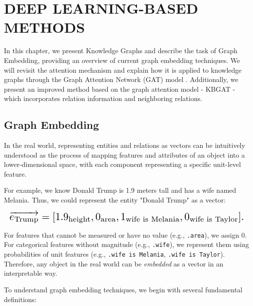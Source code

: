 \section{DEEP LEARNING-BASED METHODS}
\label{chap:DeeLearning}

In this chapter, we present Knowledge Graphs and describe the task of Graph Embedding, providing an overview of current graph embedding techniques. We will revisit the attention mechanism and explain how it is applied to knowledge graphs through the Graph Attention Network (GAT) model \cite{velivckovic2017graph}. Additionally, we present an improved method based on the graph attention model - KBGAT \cite{nathani2019learning} - which incorporates relation information and neighboring relations.

\subsection{Graph Embedding}
\label{sec:graphEmbedding}

In the real world, representing entities and relations as vectors can be intuitively understood as the process of mapping features and attributes of an object into a lower-dimensional space, with each component representing a specific unit-level feature.

For example, we know Donald Trump is 1.9 meters tall and has a wife named Melania. Thus, we could represent the entity "Donald Trump" as a vector:

\[
\resizebox{\linewidth}{!}{$
\overrightarrow{e_\text{Trump}} = [1.9_{\text{height}}, 0_{\text{area}}, 1_{\text{wife is Melania}}, 0_{\text{wife is Taylor}}].
$}
\]

For features that cannot be measured or have no value (e.g., \texttt{.area}), we assign 0. For categorical features without magnitude (e.g., \texttt{.wife}), we represent them using probabilities of unit features (e.g., \texttt{.wife is Melania}, \texttt{.wife is Taylor}). Therefore, any object in the real world can be \textit{embedded} as a vector in an interpretable way.

To understand graph embedding techniques, we begin with several fundamental definitions:

